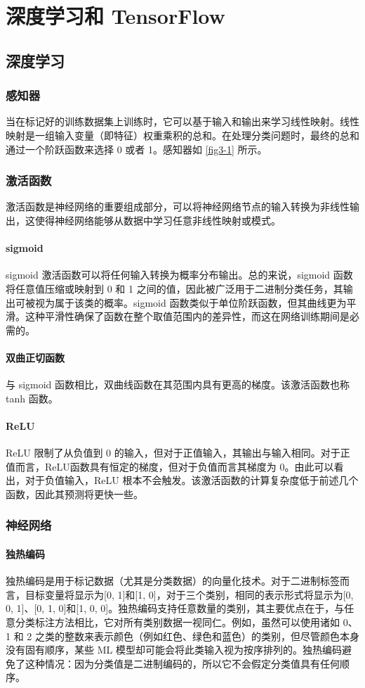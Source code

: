 \chapter{深度学习和 TensorFlow\label{ch03}}
\section{深度学习}
\subsection{感知器}
当在标记好的训练数据集上训练时，它可以基于输入和输出来学习线性映射。线性映射是一组输入变量（即特征）权重乘积的总和。在处理分类问题时，最终的总和通过一个阶跃函数来选择 0 或者 1。感知器如 \autoref{fig3-1} 所示。
\subsection{激活函数}
激活函数是神经网络的重要组成部分，可以将神经网络节点的输入转换为非线性输出，这使得神经网络能够从数据中学习任意非线性映射或模式。
\subsubsection*{sigmoid}
sigmoid 激活函数可以将任何输入转换为概率分布输出。总的来说，sigmoid 函数将任意值压缩或映射到 0 和 1 之间的值，因此被广泛用于二进制分类任务，其输出可被视为属于该类的概率。sigmoid 函数类似于单位阶跃函数，但其曲线更为平滑。这种平滑性确保了函数在整个取值范围内的差异性，而这在网络训练期间是必需的。
\subsubsection*{双曲正切函数}
与 sigmoid 函数相比，双曲线函数在其范围内具有更高的梯度。该激活函数也称 tanh 函数。
\subsubsection*{ReLU}
ReLU 限制了从负值到 0 的输入，但对于正值输入，其输出与输入相同。对于正值而言，ReLU函数具有恒定的梯度，但对于负值而言其梯度为 0。由此可以看出，对于负值输入，ReLU 根本不会触发。该激活函数的计算复杂度低于前述几个函数，因此其预测将更快一些。
\subsection{神经网络}
\subsubsection*{独热编码}
独热编码是用于标记数据（尤其是分类数据）的向量化技术。对于二进制标签而言，目标变量将显示为[0, 1]和[1, 0]，对于三个类别，相同的表示形式将显示为[0, 0, 1]、[0, 1, 0]和[1, 0, 0]。独热编码支持任意数量的类别，其主要优点在于，与任意分类标注方法相比，它对所有类别数据一视同仁。例如，虽然可以使用诸如 0、1 和 2 之类的整数来表示颜色（例如红色、绿色和蓝色）的类别，但尽管颜色本身没有固有顺序，某些 ML 模型却可能会将此类输入视为按序排列的。独热编码避免了这种情况：因为分类值是二进制编码的，所以它不会假定分类值具有任何顺序。
